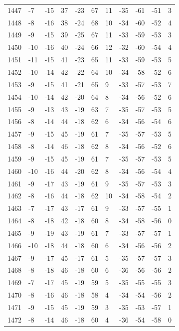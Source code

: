 \begin{table}[H]
\begin{tabular}{lllllllllll}
1447 & -7 & -15 & 37 & -23 & 67 & 11 & -35 & -61 & -51 & 3 \\
1448 & -8 & -16 & 38 & -24 & 68 & 10 & -34 & -60 & -52 & 4 \\
1449 & -9 & -15 & 39 & -25 & 67 & 11 & -33 & -59 & -53 & 3 \\
1450 & -10 & -16 & 40 & -24 & 66 & 12 & -32 & -60 & -54 & 4 \\
1451 & -11 & -15 & 41 & -23 & 65 & 11 & -33 & -59 & -53 & 5 \\
1452 & -10 & -14 & 42 & -22 & 64 & 10 & -34 & -58 & -52 & 6 \\
1453 & -9 & -15 & 41 & -21 & 65 & 9 & -33 & -57 & -53 & 7 \\
1454 & -10 & -14 & 42 & -20 & 64 & 8 & -34 & -56 & -52 & 6 \\
1455 & -9 & -13 & 43 & -19 & 63 & 7 & -35 & -57 & -53 & 5 \\
1456 & -8 & -14 & 44 & -18 & 62 & 6 & -34 & -56 & -54 & 6 \\
1457 & -9 & -15 & 45 & -19 & 61 & 7 & -35 & -57 & -53 & 5 \\
1458 & -8 & -14 & 46 & -18 & 62 & 8 & -34 & -56 & -52 & 6 \\
1459 & -9 & -15 & 45 & -19 & 61 & 7 & -35 & -57 & -53 & 5 \\
1460 & -10 & -16 & 44 & -20 & 62 & 8 & -34 & -56 & -54 & 4 \\
1461 & -9 & -17 & 43 & -19 & 61 & 9 & -35 & -57 & -53 & 3 \\
1462 & -8 & -16 & 44 & -18 & 62 & 10 & -34 & -58 & -54 & 2 \\
1463 & -7 & -17 & 43 & -17 & 61 & 9 & -33 & -57 & -55 & 1 \\
1464 & -8 & -18 & 42 & -18 & 60 & 8 & -34 & -58 & -56 & 0 \\
1465 & -9 & -19 & 43 & -19 & 61 & 7 & -33 & -57 & -57 & 1 \\
1466 & -10 & -18 & 44 & -18 & 60 & 6 & -34 & -56 & -56 & 2 \\
1467 & -9 & -17 & 45 & -17 & 61 & 5 & -35 & -57 & -57 & 3 \\
1468 & -8 & -18 & 46 & -18 & 60 & 6 & -36 & -56 & -56 & 2 \\
1469 & -7 & -17 & 45 & -19 & 59 & 5 & -35 & -55 & -55 & 3 \\
1470 & -8 & -16 & 46 & -18 & 58 & 4 & -34 & -54 & -56 & 2 \\
1471 & -9 & -15 & 45 & -19 & 59 & 3 & -35 & -53 & -57 & 1 \\
1472 & -8 & -14 & 46 & -18 & 60 & 4 & -36 & -54 & -58 & 0 \\

\end{tabular}
\end{table}
